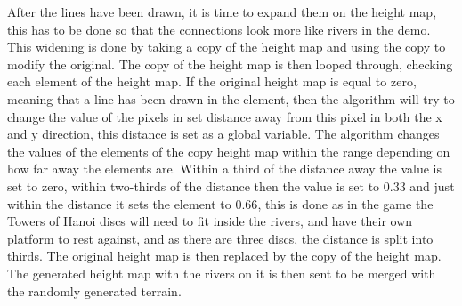 
	After the lines have been drawn, it is time to expand them on the height map, this has to be done so that the connections look more like rivers in the demo. This widening is done by taking a copy of the height map and using the copy to modify the original. The copy of the height map is then looped through, checking each element of the height map. If the original height map is equal to zero, meaning that a line has been drawn in the element, then the algorithm will try to change the value of the pixels in set distance away from this pixel in both the x and y direction, this distance is set as a global variable. The algorithm changes the values of the elements of the copy height map within the range depending on how far away the elements are. Within a third of the distance away the value is set to zero, within two-thirds of the distance then the value is set to $0.33$ and just within the distance it sets the element to $0.66$, this is done as in the game the Towers of Hanoi discs will need to fit inside the rivers, and have their own platform to rest against, and as there are three discs, the distance is split into thirds. The original height map is then replaced by the copy of the height map.\\


	The generated height map with the rivers on it is then sent to be merged with the randomly generated terrain.

